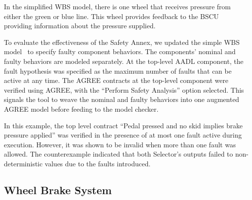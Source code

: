 In the simplified WBS model, there is one wheel that receives pressure from either the green or blue line. This wheel provides feedback to the BSCU providing information about the pressure supplied. 

To evaluate the effectiveness of the Safety Annex, we updated the simple WBS model~\cite{Stewart17:IMBSA} to specify faulty component behaviors. The components' nominal  and faulty behaviors are modeled separately. At the top-level AADL component, the fault hypothesis was specified as the maximum number of faults that can be active at any time. The AGREE contracts at the top-level component were verified using AGREE, with the ``Perform Safety Analysis'' option selected. This signals the tool to weave the nominal and faulty behaviors into one augmented AGREE model before feeding to the model checker.

In this example, the top level contract ``Pedal pressed and no skid implies brake pressure applied'' was verified in the presence of at most one fault active during execution.  However, it was shown to be invalid when more than one fault was allowed. The counterexample indicated that both Selector's outputs failed to non-deterministic values due to the faults introduced.
\fi


\subsection{Wheel Brake System}

